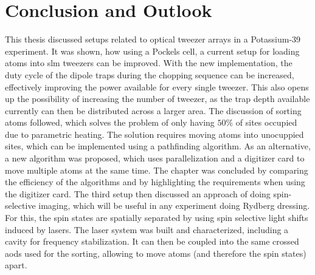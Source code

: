 \chapter{Conclusion and Outlook}

This thesis discussed setups related to optical tweezer arrays in a Potassium-39 experiment. It was shown, how using a Pockels cell, a current setup for loading atoms into \ac{slm} tweezers can be improved. With the new implementation, the duty cycle of the dipole traps during the chopping sequence can be increased, effectively improving the power available for every single tweezer. This also opens up the possibility of increasing the number of tweezer, as the trap depth available currently can then be distributed across a larger area. The discussion of sorting atoms followed, which solves the problem of only having $50\%$ of sites occupied due to parametric heating. The solution requires moving atoms into unocuppied sites, which can be implemented using a pathfinding algorithm. As an alternative, a new algorithm was proposed, which uses parallelization and a digitizer card to move multiple atoms at the same time. The chapter was concluded by comparing the efficiency of the algorithms and by highlighting the requirements when using the digitizer card. The third setup then discussed an approach of doing spin-selective imaging, which will be useful in any experiment doing Rydberg dressing. For this, the spin states are spatially separated by using spin selective light shifts induced by lasers. The laser system was built and characterized, including a cavity for frequency stabilization. It can then be coupled into the same crossed \acp{aod} used for the sorting, allowing to move atoms (and therefore the spin states) apart.
